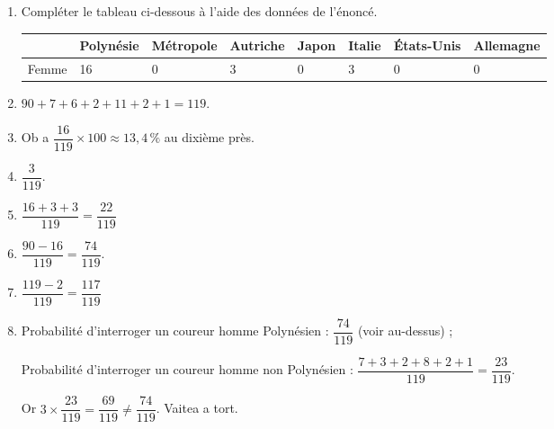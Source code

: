 \begin{enumerate}
\item Compléter le tableau ci-dessous à l'aide des données de l'énoncé. 

\medskip
\begin{tabularx}{\linewidth}{|*{8}{>{\centering \arraybackslash \footnotesize}X|}}\cline{2-8}
\multicolumn{1}{c|}{~}	&Polynésie	&Métropole	&Autriche	&Japon	&Italie	&États-Unis	&Allemagne\\ \hline
Femme					&16			&0			&3			&0		&3		&0			&0\\ \hline
\end{tabularx}
\medskip
 
\item %
$90 + 7 + 6 + 2 + 11 + 2 + 1 = 119$. 
\item %
Ob a $\dfrac{16}{119} \times 100 \approx 13,4\,\%$ au dixième près. 
\hspace*{-1cm}%
 
\item %
$\dfrac{3}{119}$. 
\item %
$\dfrac{16 + 3 + 3}{119} = \dfrac{22}{119}$
\item %
$\dfrac{90 - 16}{119} = \dfrac{74}{119}$. 
\item %
$\dfrac{119 - 2}{119} = \dfrac{117}{119}$
\item %
 
Probabilité d'interroger un coureur homme Polynésien : $\dfrac{74}{119}$  (voir au-dessus) ;

Probabilité d'interroger un coureur homme non Polynésien : $\dfrac{7 + 3 + 2 + 8  + 2 + 1}{119} = \dfrac{23}{119}$.

Or $3 \times \dfrac{23}{119} = \dfrac{69}{119} \ne \dfrac{74}{119}$. Vaitea a tort.
\end{enumerate}

\bigskip

